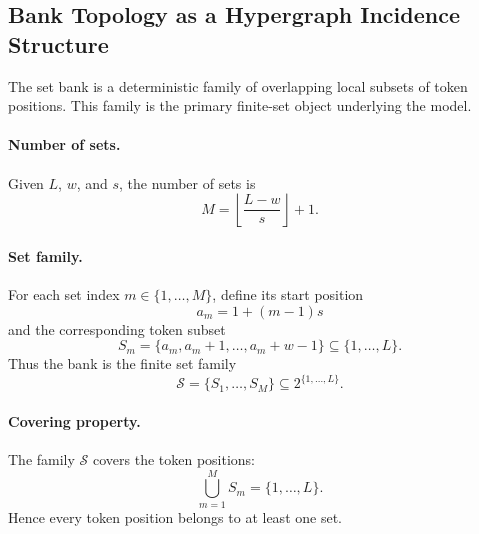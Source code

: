 \documentclass{article}
\theoremstyle{plain}
\theoremstyle{definition}
\theoremstyle{remark}
\begin{document}
\subsection{Bank Topology as a Hypergraph Incidence Structure}
\label{sec:bank-topology}

The set bank is a deterministic family of overlapping local subsets of token positions. This family is the primary finite-set object underlying the model.

\paragraph{Number of sets.}
Given $L$, $w$, and $s$, the number of sets is
\begin{equation}
\label{eq:num-sets}
M=\left\lfloor\frac{L-w}{s}\right\rfloor+1.
\end{equation}

\paragraph{Set family.}
For each set index $m\in\{1,\dots,M\}$, define its start position
\begin{equation}
\label{eq:set-start}
a_m=1+(m-1)s
\end{equation}
and the corresponding token subset
\begin{equation}
\label{eq:set-definition}
S_m=\{a_m,a_m+1,\dots,a_m+w-1\}\subseteq\{1,\dots,L\}.
\end{equation}
Thus the bank is the finite set family
\begin{equation}
\label{eq:set-family}
\mathcal{S}=\{S_1,\dots,S_M\}\subseteq 2^{\{1,\dots,L\}}.
\end{equation}

\paragraph{Covering property.}
The family $\mathcal S$ covers the token positions:
\begin{equation}
\label{eq:covering-property}
\bigcup_{m=1}^M S_m=\{1,\dots,L\}.
\end{equation}
Hence every token position belongs to at least one set.
\end{document}
